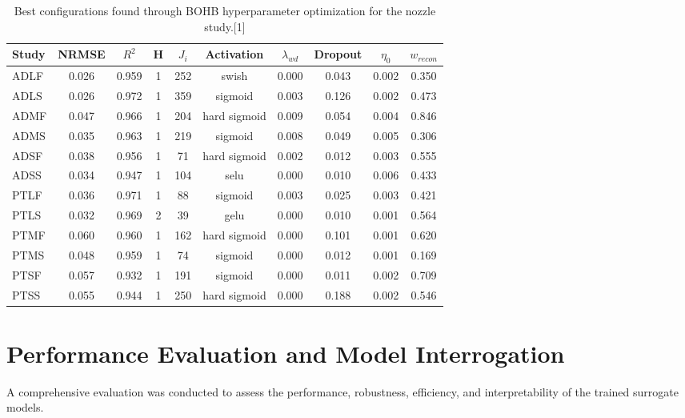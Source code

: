 \documentclass[12pt, a4paper]{report}
\begin{document}
\begin{table}[h!]
\centering
\caption{Best configurations found through BOHB hyperparameter optimization for the nozzle study.[1]}
\label{tab:best_configs_nozzle}
\begin{tabular}{lccccccccc}
\toprule
\textbf{Study} & \textbf{NRMSE} & \textbf{$R^2$} & \textbf{H} & \textbf{$J_i$} & \textbf{Activation} & \textbf{$\lambda_{wd}$} & \textbf{Dropout} & \textbf{$\eta_0$} & \textbf{$w_{recon}$} \\
\midrule
ADLF & 0.026 & 0.959 & 1 & 252 & swish & 0.000 & 0.043 & 0.002 & 0.350 \\
ADLS & 0.026 & 0.972 & 1 & 359 & sigmoid & 0.003 & 0.126 & 0.002 & 0.473 \\
ADMF & 0.047 & 0.966 & 1 & 204 & hard sigmoid & 0.009 & 0.054 & 0.004 & 0.846 \\
ADMS & 0.035 & 0.963 & 1 & 219 & sigmoid & 0.008 & 0.049 & 0.005 & 0.306 \\
ADSF & 0.038 & 0.956 & 1 & 71 & hard sigmoid & 0.002 & 0.012 & 0.003 & 0.555 \\
ADSS & 0.034 & 0.947 & 1 & 104 & selu & 0.000 & 0.010 & 0.006 & 0.433 \\
PTLF & 0.036 & 0.971 & 1 & 88 & sigmoid & 0.003 & 0.025 & 0.003 & 0.421 \\
PTLS & 0.032 & 0.969 & 2 & 39 & gelu & 0.000 & 0.010 & 0.001 & 0.564 \\
PTMF & 0.060 & 0.960 & 1 & 162 & hard sigmoid & 0.000 & 0.101 & 0.001 & 0.620 \\
PTMS & 0.048 & 0.959 & 1 & 74 & sigmoid & 0.000 & 0.012 & 0.001 & 0.169 \\
PTSF & 0.057 & 0.932 & 1 & 191 & sigmoid & 0.000 & 0.011 & 0.002 & 0.709 \\
PTSS & 0.055 & 0.944 & 1 & 250 & hard sigmoid & 0.000 & 0.188 & 0.002 & 0.546 \\
\bottomrule
\end{tabular}
\end{table}

\section{Performance Evaluation and Model Interrogation}

A comprehensive evaluation was conducted to assess the performance, robustness, efficiency, and interpretability of the trained surrogate models.
\end{document}
